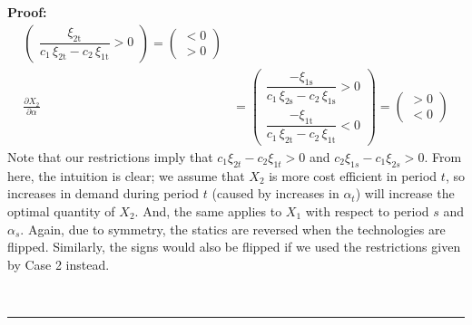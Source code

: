 \documentclass[11pt,a4paper]{extarticle}
\newenvironment{proof}[1][Proof]{\noindent\textbf{#1:} }{\ \rule{0.5em}{0.5em}}
\begin{document}
\begin{proof}
\begin{align*}
\begin{pmatrix}
	\dfrac{\xi _{\mathrm{2t}}}{c_{1}\,\xi _{\mathrm{2t}}-c_{2}\,\xi _{\mathrm{1t}}}>0
	\end{pmatrix}
	=
	\begin{pmatrix}
	< 0 \\
	> 0 
	\end{pmatrix} \\
	\frac{\partial X_2}{\partial \alpha} &= 
	\begin{pmatrix}
	\dfrac{-\xi _{\mathrm{1s}}}{c_{1}\,\xi _{\mathrm{2s}}-c_{2}\,\xi _{\mathrm{1s}}}>0 \\
	\dfrac{-\xi _{\mathrm{1t}}}{c_{1}\,\xi _{\mathrm{2t}}-c_{2}\,\xi _{\mathrm{1t}}}<0
	\end{pmatrix}
	=
	\begin{pmatrix}
	> 0 \\
	< 0 
	\end{pmatrix}
	\end{align*}
	Note that our restrictions imply that $c_1 \xi_{2t} - c_2 \xi_{1t} > 0$ and $c_2 \xi_{1s} - c_1 \xi_{2s} > 0$. From here, the intuition is clear; we assume that $X_2$ is more cost efficient in period $t$, so increases in demand during period $t$ (caused by increases in $\alpha_t$) will increase the optimal quantity of $X_2$. And, the same applies to $X_1$ with respect to period $s$ and $\alpha_s$. Again, due to symmetry, the statics are reversed when the technologies are flipped. Similarly, the signs would also be flipped if we used the restrictions given by Case 2 instead. 
	

\end{proof}
\end{document}
